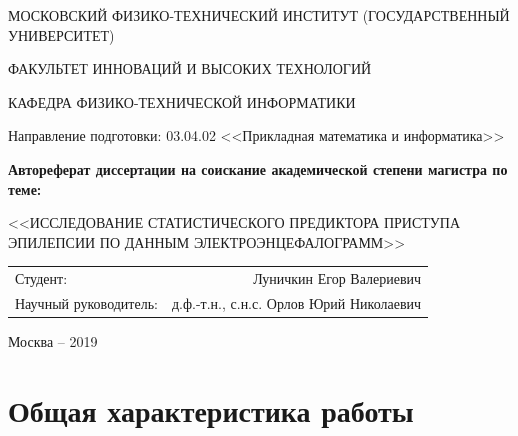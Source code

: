 \documentclass[a4paper,12pt]{report}
\begin{document}

\thispagestyle{empty}

\begin{center}
\MakeUppercase{Московский физико-технический институт (государственный университет)} \par
\MakeUppercase{Факультет инноваций и высоких технологий} \par
\MakeUppercase{Кафедра физико-технической информатики} \par
Направление подготовки: 03.04.02 <<Прикладная математика и информатика>>
\end{center}

\vspace{40mm}

\begin{center}
{\bf \large Автореферат диссертации на соискание академической степени магистра по теме:\par\MakeUppercase{<<Исследование статистического предиктора приступа эпилепсии по данным электроэнцефалограмм>>}
\par}
\end{center}

\vspace{70mm}

\begin{tabular}{lr}
{\large Студент:}     &  {\large Луничкин Егор Валериевич} \\
{\large Научный руководитель:}     &  {\large д.ф.-т.н., с.н.с. Орлов Юрий Николаевич} 
\end{tabular}

\vspace{20mm}


\begin{center}
{Москва -- 2019}
\end{center}

\tableofcontents
\clearpage


\chapter{Общая характеристика работы}
\end{document}
